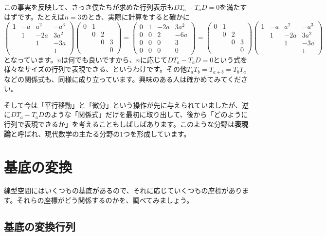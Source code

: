 この事実を反映して、さっき僕たちが求めた行列表示も$D T_a - T_a D = 0$を満たすはずです。たとえば$n = 3$のとき、実際に計算をすると確かに
\[
\begin{pmatrix}
1 & -a & a^2 & -a^3 \\
& 1 & -2a & 3a^2 \\
& & 1 & -3a \\
& & & 1
\end{pmatrix}
\begin{pmatrix}
0 & 1 \\
& 0 & 2 \\
& & 0 & 3 \\
& & & 0
\end{pmatrix}
=
\begin{pmatrix}
0 & 1 & -2a & 3a^2 \\
0 & 0 & 2 & -6a \\
0 & 0 & 0 & 3 \\
0 & 0 & 0 & 0
\end{pmatrix}
=
\begin{pmatrix}
0 & 1 \\
& 0 & 2 \\
& & 0 & 3 \\
& & & 0
\end{pmatrix}
\begin{pmatrix}
1 & -a & a^2 & -a^3 \\
& 1 & -2a & 3a^2 \\
& & 1 & -3a \\
& & & 1
\end{pmatrix}
\]
となっています。$n$は何でも良いですから、$n$に応じて$D T_a - T_a D = 0$という式を様々なサイズの行列で表現できる、というわけです。その他$T_a T_b = T_{a + b} = T_b T_a$などの関係式も、同様に成り立っています。興味のある人は確かめてみてください。

そして今は「平行移動」と「微分」という操作が先に与えられていましたが、逆に$D T_a - T_a D$のような「関係式」だけを最初に取り出して、後から「どのように行列で表現できるか」を考えることもしばしばあります。このような分野は\textbf{表現論}と呼ばれ、現代数学の主たる分野の$1$つを形成しています。

\section{基底の変換}

線型空間にはいくつもの基底があるので、それに応じていくつもの座標があります。それらの座標がどう関係するのかを、調べてみましょう。

\subsection{基底の変換行列}


